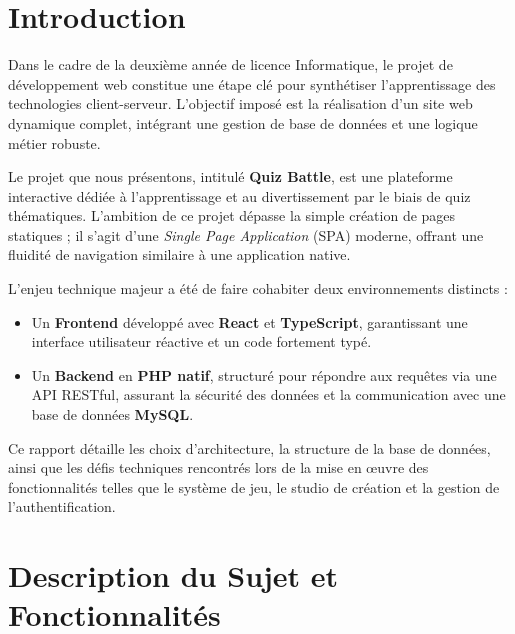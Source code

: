 \documentclass[12pt,a4paper]{article}
\begin{document}
\newpage

\tableofcontents
\newpage

\section{Introduction}

Dans le cadre de la deuxième année de licence Informatique, le projet de développement web constitue une étape clé pour synthétiser l'apprentissage des technologies client-serveur. L'objectif imposé est la réalisation d'un site web dynamique complet, intégrant une gestion de base de données et une logique métier robuste.

Le projet que nous présentons, intitulé \textbf{Quiz Battle}, est une plateforme interactive dédiée à l'apprentissage et au divertissement par le biais de quiz thématiques. L'ambition de ce projet dépasse la simple création de pages statiques ; il s'agit d'une \textit{Single Page Application} (SPA) moderne, offrant une fluidité de navigation similaire à une application native.

L'enjeu technique majeur a été de faire cohabiter deux environnements distincts :
\begin{itemize}
    \item Un \textbf{Frontend} développé avec \textbf{React} et \textbf{TypeScript}, garantissant une interface utilisateur réactive et un code fortement typé.
    \item Un \textbf{Backend} en \textbf{PHP natif}, structuré pour répondre aux requêtes via une API RESTful, assurant la sécurité des données et la communication avec une base de données \textbf{MySQL}.
\end{itemize}

Ce rapport détaille les choix d'architecture, la structure de la base de données, ainsi que les défis techniques rencontrés lors de la mise en œuvre des fonctionnalités telles que le système de jeu, le studio de création et la gestion de l'authentification.


\section{Description du Sujet et Fonctionnalités}
\end{document}
